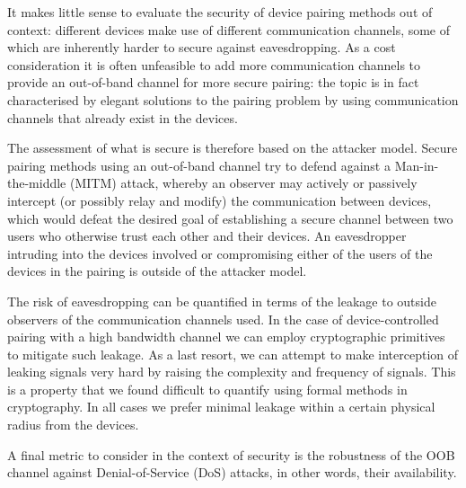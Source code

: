 \documentclass[conference, 11pt]{sty/IEEEtran}
\begin{document}
It makes little sense to evaluate the security of device pairing methods out of context: different devices make use of different communication channels, some of which are inherently harder to secure against eavesdropping.
As a cost consideration it is often unfeasible to add more communication channels to provide an out-of-band channel for more secure pairing: the topic is in fact characterised by elegant solutions to the pairing problem by using communication channels that already exist in the devices.

The assessment of what is secure is therefore based on the attacker model.
Secure pairing methods using an out-of-band channel try to defend against a Man-in-the-middle (MITM) attack, whereby an observer may actively or passively intercept (or possibly relay and modify) the communication between devices, which would defeat the desired goal of establishing a secure channel between two users who otherwise trust each other and their devices.
An eavesdropper intruding into the devices involved or compromising either of the users of the devices in the pairing is outside of the attacker model.

The risk of eavesdropping can be quantified in terms of the leakage to outside observers of the communication channels used.
In the case of device-controlled pairing with a high bandwidth channel we can employ cryptographic primitives to mitigate such leakage.
As a last resort, we can attempt to make interception of leaking signals very hard by raising the complexity and frequency of signals.
This is a property that we found difficult to quantify using formal methods in cryptography.
In all cases we prefer minimal leakage within a certain physical radius from the devices.

A final metric to consider in the context of security is the robustness of the OOB channel against Denial-of-Service (DoS) attacks, in other words, their availability.
\end{document}
